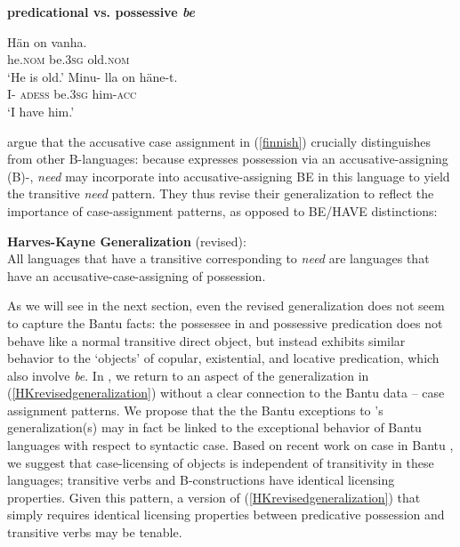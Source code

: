 \documentclass[output=paper,
modfonts
]{langscibook}
\begin{document}
\newpage 
\begin{exe}
\ex\label{finnish} \textbf{ predicational vs. possessive {\it be}} \hfill \citep[14c, 13]{Harves:2012}
\begin{xlist}
\ex\gll H\"an on vanha.\\
he.{\textsc{nom}}  be.3{\textsc{sg}} old.{\textsc{nom}}\\
\glt `He is old.' %
\ex\gll Minu- lla on h\"ane-t.\\
I- \textsc{adess} be.3{\textsc{sg}} him-\textsc{acc}\\
\glt `I have him.' %
\end{xlist}
\end{exe}

\citet{Harves:2012} argue that the accusative case assignment in (\ref{finnish})
crucially distinguishes  from other B-languages: because 
expresses possession via an accusative-assigning (B)-, {\it need}
may incorporate into accusative-assigning BE in this language to yield the transitive {\it
  need} pattern.  They thus revise their generalization to reflect the
importance of case-assignment patterns, as opposed to BE/HAVE distinctions:

\begin{exe}
\ex \label{HKrevisedgeneralization} \textbf{Harves-Kayne Generalization} (revised): \hfill \citep[15]{Harves:2012}\\
All languages that have a transitive  corresponding to {\it need}
are languages that have an accusative-case-assigning  of possession.%
\end{exe}

As we will see in the next section, even the revised 
generalization does not seem to capture the Bantu facts: the possessee
in  and  possessive predication does not behave like a normal
transitive direct object, but instead exhibits similar behavior to the
`objects' of copular, existential, and locative predication, which
also involve {\it be}.  In , we return to an
aspect of the generalization in (\ref{HKrevisedgeneralization})
without a clear connection to the Bantu data -- case assignment
patterns.  We propose that the  the Bantu
exceptions to \citet{Harves:2012}'s generalization(s) may  in fact be linked to the exceptional behavior of Bantu languages with respect to syntactic case.  Based on recent work on case in Bantu \citep[e.g.][]{Diercks:2012,Halpert:2012}, we suggest that case-licensing of objects is independent of transitivity in these languages; transitive verbs and B-constructions have identical licensing properties.  Given this pattern, a version of (\ref{HKrevisedgeneralization}) that simply requires identical licensing properties between predicative possession and transitive verbs may be tenable.  %
\end{document}
